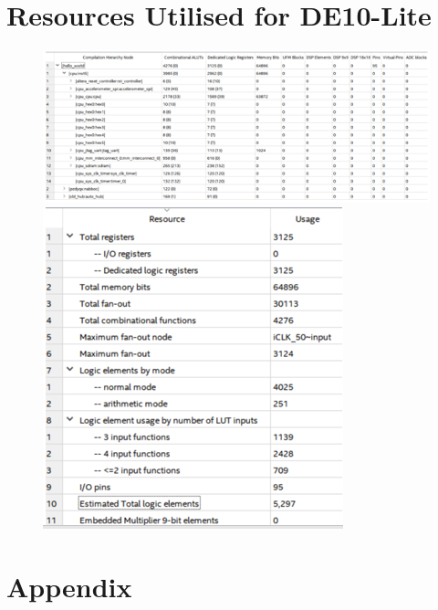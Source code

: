 \documentclass[12pt,a4paper]{article}
\begin{document}
\section{\normalsize Resources Utilised for DE10-Lite}

\begin{figure} [h!]
    \includegraphics[scale = 0.8]{Res1.png}
    \includegraphics[scale = 0.6]{Res2.PNG}
\end{figure}

\section{\normalsize Appendix}
\end{document}
